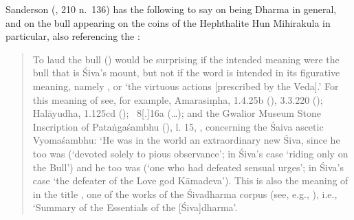 %


\noindent
Sanderson (\citeyear{SandersonTolerance2015}, 210 n.~136) has
the following to say on  being Dharma
in general, and on the bull appearing on the coins of the 
Hephthalite Hun Mihirakula in particular, also
referencing the \VSS: 

\begin{quote}
To laud the bull () 
would be surprising if the intended meaning were 
the bull that is Śiva's mount, but not if the word is intended in its figurative meaning, namely , 
or  `the virtuous actions [prescribed by
the Veda].' For this meaning of  see, for example,
Amarasiṃha,  
1.4.25b (),
3.3.220 (); 
Halāyudha,
 1.125cd (); 
\Manu\ 8[.]16a
(\dots); 
and the Gwalior Museum Stone
Inscription of Pataṅgaśambhu (), l. 15,
, 
concerning the Śaiva ascetic Vyomaśambhu: 
`He was in the
world an extraordinary new Śiva, since he too was 
(`devoted solely to pious observance'; 
in Śiva's case `riding only on the Bull') and he too was 
 (`one who had defeated sensual
urges'; in Śiva's case `the defeater of the Love god Kāmadeva'). 
This is also the meaning of  in the title \Vss,
one of the works of the Śivadharma corpus 
(see, e.g., ), i.e., 
`Summary of the Essentials of the [Śiva]dharma'. 
\end{quote}

